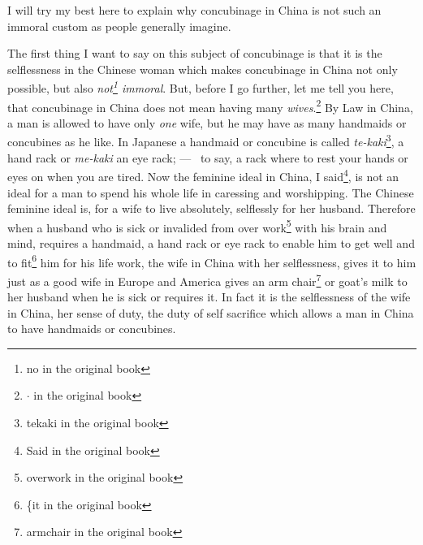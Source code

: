 I will try my best here to explain why concubinage in China is not such an immoral custom as people generally imagine.

The first thing I want to say on this subject of concubinage is that it is the selflessness in the Chinese woman which makes concubinage in China not only possible, but also \emph{not\footnote{no in the original book} immoral}.
But, before I go further, let me tell you here, that concubinage in China does not mean having many \emph{wives}.\footnote{{\huge$\cdot$} in the original book} 
By Law in China, a man is allowed to have only \emph{one} wife, but he may have as many handmaids or concubines as he like. 
In Japanese a handmaid or concubine is called \emph{te-kaki}\footnote{tekaki in the original book}, a hand rack or \emph{me-kaki} an eye rack; --- \ie\, to say, a rack where to rest your hands or eyes on when you are tired.
Now the feminine ideal in China, I said\footnote{Said in the original book}, is not an ideal for a man to spend his whole life in caressing and worshipping.
The Chinese feminine ideal is, for a wife to live absolutely, selflessly for her husband.
Therefore when a husband who is sick or invalided from over work\footnote{overwork in the original book} with his brain and mind, requires a handmaid, a hand rack or eye rack to enable him to get well and to fit\footnote{\{it in the original book} him for his life work, the wife in China with her selflessness, gives it to him just as a good wife in Europe and America gives an arm chair\footnote{armchair in the original book} or goat's milk to her husband when he is sick or requires it.
In fact it is the selflessness of the wife in China, her sense of duty, the duty of self sacrifice which allows a man in China to have handmaids or concubines.

